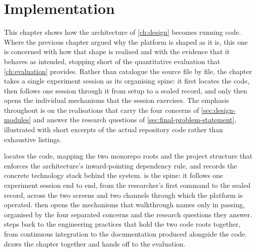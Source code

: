 \chapter{Implementation}
\label{ch:implementation}


This chapter shows how the architecture of \cref{ch:design} becomes running code.
Where the previous chapter argued why the platform is shaped as it is, this one is concerned with how that shape is realised and with the evidence that it behaves as intended, stopping short of the quantitative evaluation that \cref{ch:evaluation} provides.
Rather than catalogue the source file by file, the chapter takes a single experiment session as its organising spine: it first locates the code, then follows one session through it from setup to a sealed record, and only then opens the individual mechanisms that the session exercises.
The emphasis throughout is on the realisations that carry the four concerns of \cref{sec:design-modules} and answer the research questions of \cref{sec:final-problem-statement}, illustrated with short excerpts of the actual repository code rather than exhaustive listings.

 locates the code, mapping the two monorepo roots and the project structure that enforces the architecture's inward-pointing dependency rule, and records the concrete technology stack behind the system.
 is the spine: it follows one experiment session end to end, from the researcher's first command to the sealed record, across the two screens and two channels through which the platform is operated.
 then opens the mechanisms that walkthrough names only in passing, organised by the four separated concerns and the research questions they answer.
 steps back to the engineering practices that hold the two code roots together, from continuous integration to the documentation produced alongside the code.
 draws the chapter together and hands off to the evaluation.

